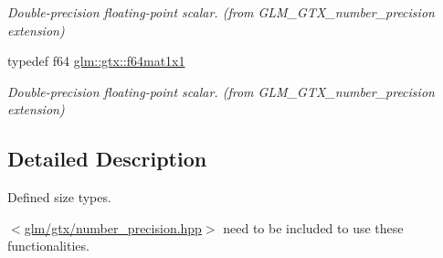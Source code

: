 \begin{DoxyCompactItemize}
\begin{DoxyCompactList}\small\item\em Double-\/precision floating-\/point scalar. (from G\+L\+M\+\_\+\+G\+T\+X\+\_\+number\+\_\+precision extension) \end{DoxyCompactList}\item 
typedef f64 \hyperlink{group__gtx__number__precision_ga710a5952d78b22635c71c5fc2c0a3319}{glm\+::gtx\+::f64mat1x1}\hypertarget{group__gtx__number__precision_ga710a5952d78b22635c71c5fc2c0a3319}{}\label{group__gtx__number__precision_ga710a5952d78b22635c71c5fc2c0a3319}

\begin{DoxyCompactList}\small\item\em Double-\/precision floating-\/point scalar. (from G\+L\+M\+\_\+\+G\+T\+X\+\_\+number\+\_\+precision extension) \end{DoxyCompactList}\end{DoxyCompactItemize}


\subsection{Detailed Description}
Defined size types. 

$<$\hyperlink{number__precision_8hpp}{glm/gtx/number\+\_\+precision.\+hpp}$>$ need to be included to use these functionalities. 